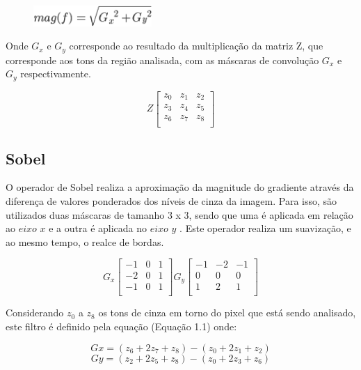 \documentclass[
	12pt,				%
	oneside,			%
	a4paper,			%
	english,			%
	french,				%
	spanish,			%
	brazil,				%
	]{abntex2}
\begin{document}
\begin{figure}[ht]
\centering
\includegraphics[width=0.4\textwidth]{imagens/magnitude.png}
\end{figure}


Onde \(G_x\) e \(G_y\) corresponde ao resultado da multiplicação da matriz Z, que corresponde aos tons da região analisada, com as máscaras de convolução \(G_x\) e \(G_y\) respectivamente.


\[
Z
\begin{bmatrix}
    z_0 & z_1 & z_2    \\
	z_3 & z_4 & z_5    \\  
	z_6 & z_7 & z_8    \\  
\end{bmatrix} 
\]

\subsection{Sobel}

O operador de Sobel realiza a aproximação da magnitude do gradiente através da diferença de valores ponderados dos níveis de cinza da imagem. Para isso, são utilizados duas máscaras de tamanho 3 x 3, sendo que uma é aplicada em relação ao \(eixo\) \(x\) e a outra é aplicada no \(eixo\) \(y\) \cite{pedriniSchwartz:2008}. Este operador realiza um suavização, e ao mesmo tempo, o realce de bordas.

\[
G_x
\begin{bmatrix}
    -1 & 0 & 1   \\ 
	-2 & 0 & 1   \\ 
	-1 & 0 & 1   \\ 
\end{bmatrix} 
G_y
\begin{bmatrix}
    -1 & -2 & -1   \\ 
	 0 &  0 & 0    \\ 
	 1 &  2 & 1    \\    
\end{bmatrix} 
\]

Considerando \(z_0\) a \(z_8\) os tons de cinza em torno do pixel que está sendo analisado, este filtro é definido pela equação (Equação 1.1) onde:

\[Gx = (z_6 + 2z_7 + z_8) - (z_0 + 2z_1 + z_2)\]
\[Gy = (z_2 + 2z_5 + z_8) - (z_0 + 2z_3 + z_6)\]
\end{document}
